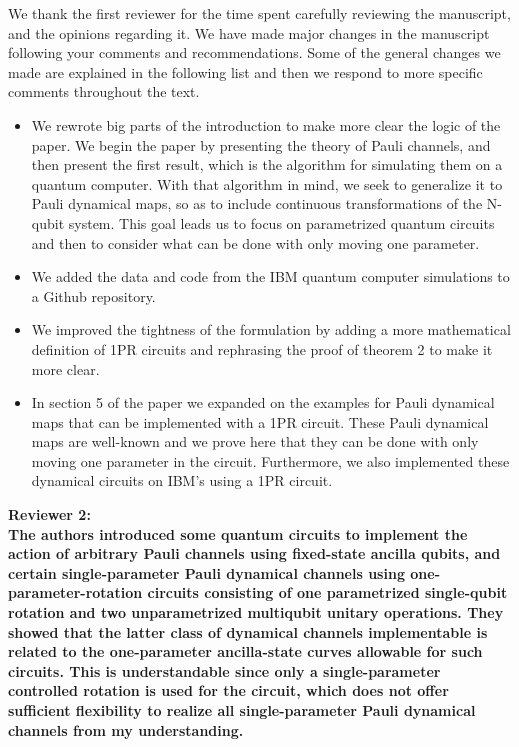 \documentclass[10pt,letterpaper]{article} %
\begin{document}
We thank the first reviewer for the time spent carefully 
reviewing the manuscript, and the opinions regarding it.
We have made major changes in the manuscript following your comments and recommendations. 
Some of the general changes we made are explained in the following list
and then we respond to more specific comments
throughout the text.
\begin{itemize}
\item We rewrote big parts of the introduction to make more clear the logic of the paper. 
We begin the paper by presenting the theory of Pauli channels, 
and then present the first result, which is the algorithm for simulating them on a quantum computer.
With that algorithm in mind, we seek to generalize it to Pauli dynamical maps, 
so as to include continuous transformations of the 
N-qubit system. This goal leads us to
focus on parametrized quantum circuits and then to consider
what can be done with only moving one parameter.
\item We added the data and code from the IBM quantum computer simulations
to a Github repository.
\item We improved the tightness of the formulation by adding
a more mathematical definition of 1PR circuits and
rephrasing the proof of theorem 2 to make it more clear. 
\item In section 5 of the paper we expanded on the examples for Pauli dynamical maps
that can be implemented with a 1PR circuit.
These Pauli dynamical maps are well-known and we prove here
that they can be done with only moving one parameter in the circuit.
Furthermore, we also implemented these dynamical circuits on IBM's using a 1PR circuit.

\end{itemize}




\textbf{Reviewer 2:} \\
\textbf{The authors introduced some quantum circuits to implement the action
of arbitrary Pauli channels using fixed-state ancilla qubits, and
certain single-parameter Pauli dynamical channels using
one-parameter-rotation circuits consisting of one parametrized
single-qubit rotation and two unparametrized multiqubit unitary
operations. They showed that the latter class of dynamical channels
implementable is related to the one-parameter ancilla-state curves
allowable for such circuits. This is understandable since only a
single-parameter controlled rotation is used for the circuit, which
does not offer sufficient flexibility to realize all single-parameter
Pauli dynamical channels from my understanding.}
\end{document}
